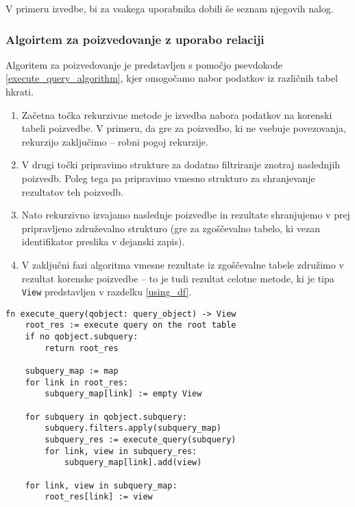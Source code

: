 \documentclass[a4paper,12pt,openright]{book}
\begin{document}
\begin{itemize}
        \noindent
        V primeru izvedbe, bi za vsakega uporabnika dobili še seznam njegovih nalog.

        \subsubsection{Algoirtem za poizvedovanje z uporabo relaciji}
        \label{query_execution}

        Algoritem za poizvedovanje je predstavljen s pomočjo psevdokode \ref{execute_query_algorithm}, kjer omogočamo nabor podatkov iz različnih tabel hkrati.

        \begin{enumerate}
            \item Začetna točka rekurzivne metode je izvedba nabora podatkov na korenski tabeli poizvedbe. V primeru, da gre za poizvedbo, ki ne vsebuje povezovanja, rekurzijo zaključimo – robni pogoj rekurzije.
            \item V drugi točki pripravimo strukture za dodatno filtriranje znotraj naslednjih poizvedb. Poleg tega pa pripravimo vmesno strukturo za shranjevanje rezultatov teh poizvedb.
            \item Nato rekurzivno izvajamo naslednje poizvedbe in rezultate shranjujemo v prej pripravljeno združevalno strukturo (gre za zgoščevalno tabelo, ki vezan identifikator preslika v dejanski zapis).
            \item V zaključni fazi algoritma vmesne rezultate iz zgoščevalne tabele združimo v rezultat korenske poizvedbe – to je tudi rezultat celotne metode, ki je tipa {\tt View} predstavljen v razdelku \ref{using_df}.
        \end{enumerate}

\begin{code}
\begin{verbatim}
fn execute_query(qobject: query_object) -> View
    root_res := execute query on the root table
    if no qobject.subquery:
        return root_res

    subquery_map := map
    for link in root_res:
        subquery_map[link] := empty View

    for subquery in qobject.subquery:
        subquery.filters.apply(subquery_map)
        subquery_res := execute_query(subquery)
        for link, view in subquery_res:
            subquery_map[link].add(view)

    for link, view in subquery_map:
        root_res[link] := view


\end{verbatim}
\end{code}
\end{itemize}
\end{document}

